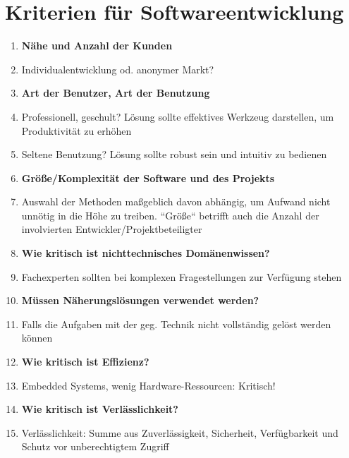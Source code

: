 \section{Kriterien für Softwareentwicklung}

\begin{tcolorbox}[title=Kriterien für Softwareentwicklung]
    \begin{enumerate}
        \item \textbf{Nähe und Anzahl der Kunden}
        \item[] Individualentwicklung od. anonymer Markt?
        \item \textbf{Art der Benutzer, Art der Benutzung}
        \item[] Professionell, geschult? Lösung sollte effektives Werkzeug darstellen, um Produktivität zu erhöhen
        \item[] Seltene Benutzung? Lösung sollte robust sein und intuitiv zu bedienen
        \item \textbf{Größe/Komplexität der Software und des Projekts}
        \item[] Auswahl der Methoden maßgeblich davon abhängig, um Aufwand nicht unnötig in die Höhe zu treiben.
        ``Größe`` betrifft auch die Anzahl der involvierten Entwickler/Projektbeteiligter
        \item \textbf{Wie kritisch ist nichttechnisches Domänenwissen?}
        \item[] Fachexperten sollten bei komplexen Fragestellungen zur Verfügung stehen
        \item \textbf{Müssen Näherungslösungen verwendet werden?}
        \item[] Falls die Aufgaben mit der geg. Technik nicht vollständig gelöst werden können
        \item \textbf{Wie kritisch ist Effizienz?}
        \item[] Embedded Systems, wenig Hardware-Ressourcen: Kritisch!
        \item \textbf{Wie kritisch ist Verlässlichkeit?}
        \item[] Verlässlichkeit: Summe aus Zuverlässigkeit, Sicherheit, Verfügbarkeit und Schutz vor unberechtigtem Zugriff
    \end{enumerate}
\end{tcolorbox}